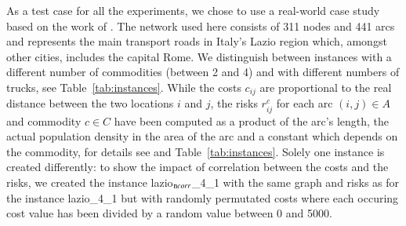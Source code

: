 \documentclass[preprint,12pt]{elsarticle}
\begin{document}
As a test case for all the experiments, we chose to use a real-world case study based on the work of \citet{bianco09}. The network used here consists of 311 nodes and 441 arcs and represents the main transport roads in Italy's Lazio region which, amongst other cities, includes the capital Rome. We distinguish between instances with a different number of commodities (between 2 and 4) and with different numbers of trucks, see Table~\ref{tab:instances}. While the costs $c_{ij}$ are proportional to the real distance between the two locations $i$ and $j$, the risks $r_{ij}^c$ for each arc $(i,j) \in A$ and commodity $c \in C$ have been computed as a product of the arc's length, the actual population density in the area of the arc and a constant which depends on the commodity, for details see \citep{bianco09} and Table~\ref{tab:instances}. Solely one instance is created differently: to show the impact of correlation between the costs and the risks, we created the instance lazio$_{\text ncorr}$\_4\_1 with the same graph and risks as for the instance lazio\_4\_1 but with randomly permutated costs where each occuring cost value has been divided by a random value between 0 and 5000.
\end{document}
